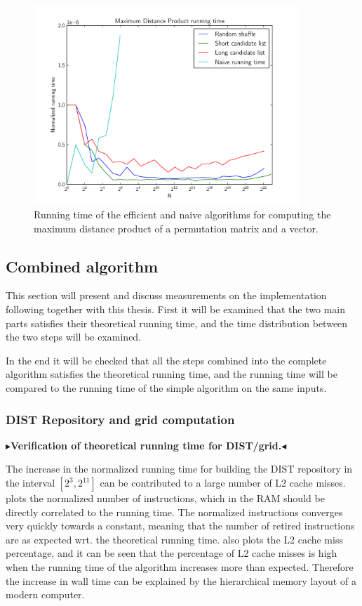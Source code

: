 \documentclass[twoside,11pt,openright]{report}
\newcommand{\todo}[1]{{\color[rgb]{.5,0,0}\textbf{$\blacktriangleright$#1$\blacktriangleleft$}}}
\begin{document}
\begin{figure}[h!]
  \centering
  \includegraphics[width=10cm]{distance-mult/max-dist-mult}
  \caption{Running time of the efficient and naive algorithms for computing the maximum distance product of a permutation matrix and a vector.}
  \label{fig:benchmark:max-distance}
\end{figure}

\subsection{Combined algorithm}
This section will present and discuss measurements on the implementation following together with this thesis. First it will be examined that the two main parts satisfies their theoretical running time, and the time distribution between the two steps will be examined.

In the end it will be checked that all the steps combined into the complete algorithm satisfies the theoretical running time, and the running time will be compared to the running time of the simple algorithm on the same inputs.

\subsubsection{DIST Repository and grid computation}
\todo{Verification of theoretical running time for DIST/grid.}

The increase in the normalized running time for building the DIST repository in the interval $[2^3,2^11]$ can be contributed to a large number of L2 cache misses.  plots the normalized number of instructions, which in the RAM should be directly correlated to the running time. The normalized instructions converges very quickly towards a constant, meaning that the number of retired instructions are as expected wrt. the theoretical running time.  also plots the L2 cache miss percentage, and it can be seen that the percentage of L2 cache misses is high when the running time of the algorithm increases more than expected. Therefore the increase in wall time can be explained by the hierarchical memory layout of a modern computer.
\end{document}
